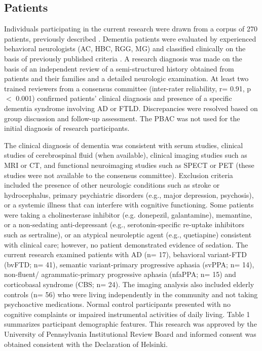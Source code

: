 \documentclass[preprint,authoryear,12pt]{elsarticle}
\begin{document}
\subsection{Patients}  Individuals participating in the current research were drawn from a corpus of 270 patients, previously described \citet{libon_philadelphia_2011}.  Dementia patients were evaluated by experienced behavioral neurologists (AC, HBC, RGG, MG) and classified clinically on the basis of previously published criteria \citet{McKhann01,Rascovsky2011,Gorno-Tempini20111006}.  A research diagnosis was made on the basis of an independent review of a semi-structured history obtained from patients and their families and a detailed neurologic examination.  At least two trained reviewers from a consensus committee (inter-rater reliability, r= 0.91, p $<$ 0.001) confirmed patients' clinical diagnosis and presence of a specific dementia syndrome involving AD or FTLD. Discrepancies were resolved based on group discussion and follow-up assessment.  The PBAC was not used for the initial diagnosis of research participants.  

The clinical diagnosis of dementia was consistent with serum studies, clinical studies of cerebrospinal fluid (when available), clinical imaging studies such as MRI or CT, and functional neuroimaging studies such as SPECT or PET (these studies were not available to the consensus committee).  Exclusion criteria included the presence of other neurologic conditions such as stroke or hydrocephalus, primary psychiatric disorders (e.g., major depression, psychosis), or a systemic illness that can interfere with cognitive functioning.  Some patients were taking a cholinesterase inhibitor (e.g. donepezil, galantamine), memantine, or a non-sedating anti-depressant (e.g., serotonin-specific re-uptake inhibitors such as sertraline), or an atypical neuroleptic agent (e.g., quetiapine) consistent with clinical care; however, no patient demonstrated evidence of sedation.  The current research examined patients with AD (n= 17), behavioral variant-FTD (bvFTD; n= 41), semantic variant-primary progressive aphasia (svPPA; n= 14), non-fluent/ agrammatic-primary progressive aphasia (nfaPPA; n= 15) and corticobasal syndrome (CBS; n= 24).  The imaging analysis also included elderly controls (n= 56) who were living independently in the community and not taking psychoactive medications.  Normal control participants presented with no cognitive complaints or impaired instrumental activities of daily living.  Table 1 summarizes participant demographic features.  This research was approved by the University of Pennsylvania Institutional Review Board and informed consent was obtained consistent with the Declaration of Helsinki.
\end{document}
